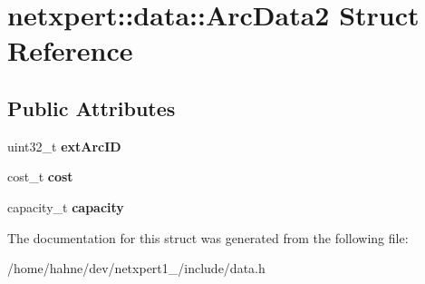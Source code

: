 \hypertarget{structnetxpert_1_1data_1_1ArcData2}{}\section{netxpert\+:\+:data\+:\+:Arc\+Data2 Struct Reference}
\label{structnetxpert_1_1data_1_1ArcData2}
\subsection*{Public Attributes}
\begin{DoxyCompactItemize}
\item 
uint32\+\_\+t {\bfseries ext\+Arc\+ID}\hypertarget{structnetxpert_1_1data_1_1ArcData2_a62c22f8476890c895f28d9249bcee1c4}{}\label{structnetxpert_1_1data_1_1ArcData2_a62c22f8476890c895f28d9249bcee1c4}

\item 
cost\+\_\+t {\bfseries cost}\hypertarget{structnetxpert_1_1data_1_1ArcData2_a4e179bd2eaae29d77afb3784e7d4ec38}{}\label{structnetxpert_1_1data_1_1ArcData2_a4e179bd2eaae29d77afb3784e7d4ec38}

\item 
capacity\+\_\+t {\bfseries capacity}\hypertarget{structnetxpert_1_1data_1_1ArcData2_ad59784d0ca1a5d73e3edea5d4a452024}{}\label{structnetxpert_1_1data_1_1ArcData2_ad59784d0ca1a5d73e3edea5d4a452024}

\end{DoxyCompactItemize}


The documentation for this struct was generated from the following file\+:\begin{DoxyCompactItemize}
\item 
/home/hahne/dev/netxpert1\+\_/include/data.\+h\end{DoxyCompactItemize}

